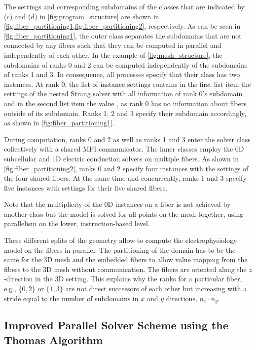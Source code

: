 The settings and corresponding subdomains of the  classes that are indicated by (c) and (d) in \cref{fig:program_structure} are shown in \cref{fig:fiber_partitioning1,fig:fiber_partitioning2}, respectively.
As can be seen in \cref{fig:fiber_partitioning1}, the outer  class separates the subdomains that are not connected by any fibers such that they can be computed in parallel and independently of each other. In the example of \cref{fig:mesh_structure}, the subdomains of ranks 0 and 2 can be computed independently of the subdomains of ranks 1 and 3. In consequence, all processes specify that their  class has two instances. At rank 0, the list of instance settings contains in the first list item the settings of the nested Strang solver with all information of rank 0's subdomain and in the second list item the value , as rank 0 has no information about fibers outside of its subdomain. Ranks 1, 2 and 3 specify their subdomain accordingly, as shown in \cref{fig:fiber_partitioning1}.

During computation, ranks 0 and 2 as well as ranks 1 and 3 enter the  solver class collectively with a shared MPI communicator.
The inner  classes employ the 0D subcellular and 1D electric conduction solvers on multiple fibers. As shown in \cref{fig:fiber_partitioning2}, ranks 0 and 2 specify four instances with the settings of the four shared fibers. At the same time and concurrently, ranks 1 and 3 specify five instances with settings for their five shared fibers. 

Note that the multiplicity of the 0D instances on a fiber is not achieved by another  class but the model is solved for all points on the mesh together, using parallelism on the lower, instruction-based level.

These different splits of the geometry allow to compute the electrophysiology model on the fibers in parallel. The partitioning of the domain has to be the same for the 3D mesh and the embedded fibers to allow value mapping from the fibers to the 3D mesh without communication. The fibers are oriented along the $z$-direction in the 3D setting. This explains why the ranks for a particular fiber, e.g., $\{0,2\}$ or $\{1,3\}$ are not direct successors of each other but increasing with a stride equal to the number of subdomains in $x$ and $y$ directions, $n_x \cdot n_y$.

\subsection{Improved Parallel Solver Scheme using the Thomas Algorithm}\label{sec:improved_parallel_solver_for_fiber_based}

